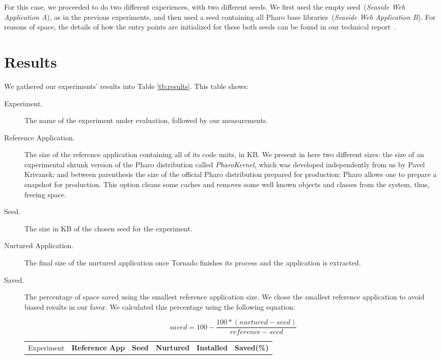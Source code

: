 For this case, we proceeded to do two different experiences, with two different seeds. We first used the empty seed~(\emph{Seaside Web Application A}), as in the previous experiments, and then used a seed containing all Pharo base libraries~(\emph{Seaside Web Application B}). For reasons of space, the details of how the entry points are initialized for these both seeds can be found in our technical report~\cite{Poli14a}.

\section{Results} \label{sec:results_discussion}

We gathered our experiments' results into Table \ref{tb:results}. This table shows:
\begin{description}
\item[Experiment.] The name of the experiment under evaluation, followed by our measurements.
\item[Reference Application.] The size of the reference application containing all of its code units, in KB. We present in here two different sizes: the size of an experimental shrunk version of the Pharo distribution called \emph{PharoKernel}, which was developed independently from us by Pavel Krivanek; and between parenthesis the size of the official Pharo distribution prepared for production: Pharo allows one to prepare a snapshot for production. This option cleans some caches and removes some well known objects and classes from the system, thus, freeing space.
\item[Seed.] The size in KB of the chosen seed for the experiment.
\item[Nurtured Application.] The final size of the nurtured application once Tornado finishes its process and the application is extracted.
\item[Saved.] The percentage of space saved using the smallest reference application size. We chose the smallest reference application to avoid biased results in our favor. We calculated this percentage using the following equation:

\begin{equation*}
saved = 100 - \frac{100*(nurtured - seed)}{reference - seed}
\end{equation*}

\begin{table}[ht]
 	\centering
 	\begin{tabular}{lccccc}
		\toprule
			Experiment
 			& \textbf{Reference App}
			& \textbf{Seed}
			& \textbf{Nurtured}
			& \textbf{Installed}
			& \textbf{Saved(\%)}\\
			

\end{tabular}
\end{table}
\end{description}
